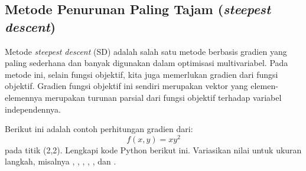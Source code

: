 \subsection{Metode Penurunan Paling Tajam (\textit{steepest descent})}

Metode \textit{steepest descent} (SD) adalah salah satu metode berbasis gradien
yang paling sederhana dan banyak digunakan dalam optimisasi multivariabel.
Pada metode ini, selain fungsi objektif, kita juga memerlukan gradien dari
fungsi objektif. Gradien fungsi objektif ini sendiri merupakan vektor yang
elemen-elemennya merupakan turunan parsial dari fungsi objektif terhadap
variabel independennya.

\begin{soal}
Berikut ini adalah contoh perhitungan gradien dari:
\begin{equation*}
f(x,y) = xy^2
\end{equation*}
pada titik (2,2).
Lengkapi kode Python berikut ini. Variasikan nilai  untuk
ukuran langkah, misalnya ,
, , , ,
dan .
\end{soal}


